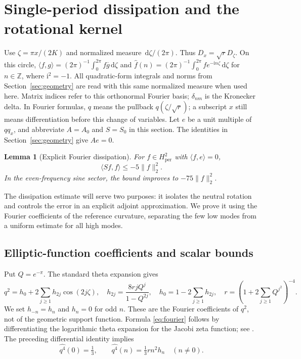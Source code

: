 \documentclass[a4paper,11pt]{article}
\numberwithin{equation}{section}
\newtheorem{lemma}[theorem]{Lemma}
\theoremstyle{definition}
\theoremstyle{remark}
\newcommand{\Z}{\mathbb Z}
\newcommand{\dd}{\,\mathrm d}
\newcommand{\ii}{\mathrm i}
\newcommand{\per}{\mathrm{per}}
\newcommand{\norm}[1]{\lVert#1\rVert}
\newcommand{\ip}[2]{\langle#1,#2\rangle}
\begin{document}
\section{Single-period dissipation and the rotational kernel}\label{app:single}\label{sec:spectrum}
Use $\zeta=\pi x/(2K)$ and normalized measure $\dd\zeta/(2\pi)$. Thus $D_x=\sqrt rD_\zeta$. On this circle, $\ip f g=(2\pi)^{-1}\int_0^{2\pi}f\overline g\dd\zeta$ and $\widehat f(n)=(2\pi)^{-1}\int_0^{2\pi}f e^{-\ii n\zeta}\dd\zeta$ for $n\in\Z$, where $\ii^2=-1$. All quadratic-form integrals and norms from Section~\ref{sec:geometry} are read with this same normalized measure when used here. Matrix indices refer to this orthonormal Fourier basis; $\delta_{nm}$ is the Kronecker delta. In Fourier formulas, $q$ means the pullback $q(\zeta/\sqrt r)$; a subscript $x$ still means differentiation before this change of variables. Let $e$ be a unit multiple of $qq_x$, and abbreviate $A=A_0$ and $S=S_0$ in this section. The identities in Section~\ref{sec:geometry} give $Ae=0$.
\begin{lemma}[Explicit Fourier dissipation]\label{lem:coercivity}
For $f\in H^2_\per$ with $\ip f e=0$,
\begin{equation}\label{eq:coercivity}
\ip{Sf}f\le-5\norm f_2^2.
\end{equation}
In the even-frequency sine sector, the bound improves to $-75\norm f_2^2$.
\end{lemma}


The dissipation estimate will serve two purposes: it isolates the neutral rotation and controls the error in an explicit adjoint approximation. We prove it using the Fourier coefficients of the reference curvature, separating the few low modes from a uniform estimate for all high modes.

\subsection{Elliptic-function coefficients and scalar bounds}
Put $Q=e^{-\pi}$. The standard theta expansion gives
\begin{equation}\label{eq:fourier}
 q^2=h_0+2\sum_{j\ge1}h_{2j}\cos(2j\zeta),\quad
 h_{2j}=\frac{8rjQ^j}{1-Q^{2j}},\quad h_0=1-2\sum_{j\ge1}h_{2j},\quad
 r=\left(1+2\sum_{j\ge1}Q^{j^2}\right)^{-4}.
\end{equation}
We set $h_{-n}=h_n$ and $h_n=0$ for odd $n$. These are the Fourier coefficients of $q^2$, not of the geometric support function. Formula \eqref{eq:fourier} follows by differentiating the logarithmic theta expansion for the Jacobi zeta function; see \cite{DLMF}. The preceding differential identity implies
\begin{equation}\label{eq:q4}
 \widehat{q^4}(0)=\tfrac13,\qquad
 \widehat{q^4}(n)=\tfrac13rn^2h_n\quad(n\ne0).
\end{equation}
\end{document}
